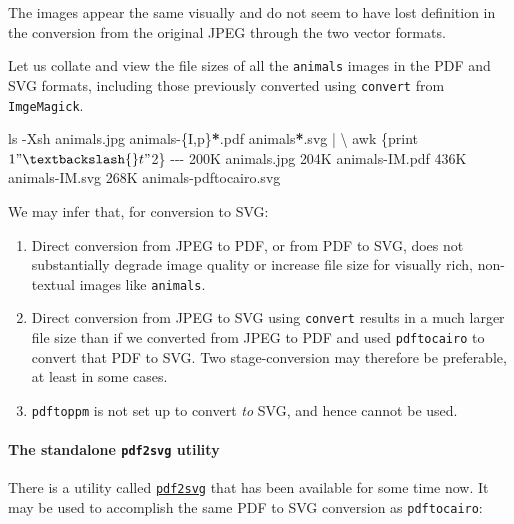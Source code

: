 \documentclass[
  12pt,
  british,
  a4paper,
  rgb,
  dvipsnames,
  svgnames,
  hyphens]{article}
\newenvironment{Shaded}{\begin{snugshade}}{\end{snugshade}}
\newcommand{\AttributeTok}[1]{\textcolor[rgb]{0.80,0.80,0.80}{#1}}
\newcommand{\DataTypeTok}[1]{\textcolor[rgb]{0.87,0.87,0.75}{#1}}
\newcommand{\ExtensionTok}[1]{\textcolor[rgb]{0.80,0.80,0.80}{#1}}
\newcommand{\FunctionTok}[1]{\textcolor[rgb]{0.94,0.94,0.56}{#1}}
\newcommand{\KeywordTok}[1]{\textcolor[rgb]{0.94,0.87,0.69}{#1}}
\newcommand{\NormalTok}[1]{\textcolor[rgb]{0.80,0.80,0.80}{#1}}
\newcommand{\OperatorTok}[1]{\textcolor[rgb]{0.94,0.94,0.82}{#1}}
\newcommand{\PreprocessorTok}[1]{\textcolor[rgb]{1.00,0.81,0.69}{\textbf{#1}}}
\newcommand{\StringTok}[1]{\textcolor[rgb]{0.80,0.58,0.58}{#1}}
\begin{document}
The images appear the same visually and do not seem to have lost
definition in the conversion from the original JPEG through the two
vector formats.

Let us collate and view the file sizes of all the \texttt{animals}
images in the PDF and SVG formats, including those previously converted
using \texttt{convert} from \texttt{ImgeMagick}.

\begin{Shaded}
\begin{Highlighting}[]
\FunctionTok{ls} \AttributeTok{{-}Xsh}\NormalTok{ animals.jpg animals{-}}\DataTypeTok{\{I}\OperatorTok{,}\DataTypeTok{p\}}\PreprocessorTok{*}\NormalTok{.pdf animals}\PreprocessorTok{*}\NormalTok{.svg }\KeywordTok{|} \DataTypeTok{\textbackslash{}}
\FunctionTok{awk} \StringTok{\textquotesingle{}\{print $1 "\textbackslash{}t" $2\}\textquotesingle{}}
\ExtensionTok{{-}{-}{-}}
\ExtensionTok{200K}\NormalTok{    animals.jpg}
\ExtensionTok{204K}\NormalTok{    animals{-}IM.pdf}
\ExtensionTok{436K}\NormalTok{    animals{-}IM.svg}
\ExtensionTok{268K}\NormalTok{    animals{-}pdftocairo.svg}
\end{Highlighting}
\end{Shaded}

We may infer that, for conversion to SVG:

\begin{enumerate}
\item
  Direct conversion from JPEG to PDF, or from PDF to SVG, does not
  substantially degrade image quality or increase file size for visually
  rich, non-textual images like \texttt{animals}.
\item
  Direct conversion from JPEG to SVG using \texttt{convert} results in a
  much larger file size than if we converted from JPEG to PDF and used
  \texttt{pdftocairo} to convert that PDF to SVG. Two stage-conversion
  may therefore be preferable, at least in some cases.
\item
  \texttt{pdftoppm} is not set up to convert \emph{to} SVG, and hence
  cannot be used.
\end{enumerate}

\hypertarget{the-standalone-pdf2svg-utility}{%
\paragraph{\texorpdfstring{The standalone \texttt{pdf2svg}
utility}{The standalone pdf2svg utility}}\label{the-standalone-pdf2svg-utility}}

There is a utility called
\href{https://github.com/dawbarton/pdf2svg}{\texttt{pdf2svg}} that has
been available for some time now. It may be used to accomplish the same
PDF to SVG conversion as \texttt{pdftocairo}:
\end{document}
